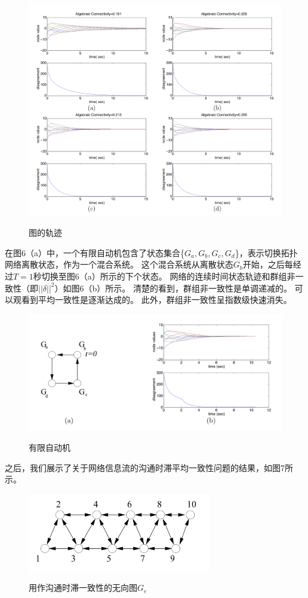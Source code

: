 \documentclass{article}
\begin{document}
\begin{figure}[htbp]
    \centering
    \includegraphics[width=14.5cm]{figures/Fig5-Simulation.jpeg}
    \label{Simulation}
    \caption{图的轨迹}
\end{figure}

在图6（a）中，一个有限自动机包含了状态集合\{$G_a, G_b, G_c, G_d$\}，表示切换拓扑网络离散状态，作为一个混合系统。
这个混合系统从离散状态$G_b$开始，之后每经过$T=1$秒切换至图6（a）所示的下个状态。
网络的连续时间状态轨迹和群组非一致性（即$||\delta||^2$）如图6（b）所示。
清楚的看到，群组非一致性是单调递减的。
可以观看到平均一致性是逐渐达成的。
此外，群组非一致性呈指数级快速消失。
\begin{figure}[htbp]
    \centering
    \includegraphics[width=14.5cm]{figures/Fig6-Automaton.jpeg}
    \label{Automaton}
    \caption{有限自动机}
\end{figure}

之后，我们展示了关于网络信息流的沟通时滞平均一致性问题的结果，如图7所示。
\begin{figure}[htbp]
    \centering
    \includegraphics[width=8cm]{figures/Fig7-Undirected.jpeg}
    \label{Undirected}
    \caption{用作沟通时滞一致性的无向图$G_e$}
\end{figure}
\end{document}
